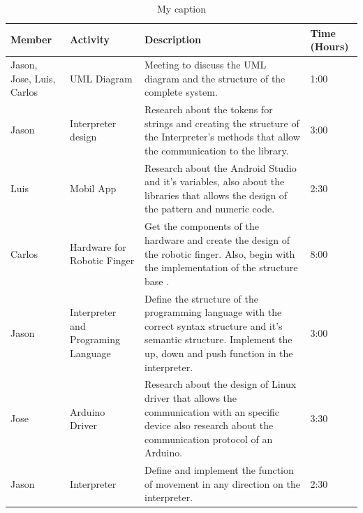 \documentclass[12pt,twoside]{article}
\begin{document}
\begin{table}[H]
\centering
\caption{My caption}
\label{my-label}
\begin{tabular}{ | m{7em} | m{7em} | m{16em} | m{4em} |}
\hline
\textbf{Member}                & \textbf{Activity}                            & \textbf{Description}                                                                                                                                                                                         & \textbf{Time (Hours)} \\
\hline
Jason, Jose, Luis, Carlos & UML Diagram                         & Meeting to discuss the UML diagram and the structure of the complete system.                                                                                                                        & 1:00         \\
\hline
Jason                    & Interpreter design                  & Research about the tokens for strings and creating the structure of the Interpreter's methods that allow the communication to the library.                                                          & 3:00         \\
\hline
Luis                     & Mobil App                           & Research about the Android Studio and it's variables, also about the libraries that allows the design of the pattern and numeric code.                                                              & 2:30         \\
\hline
Carlos                   & Hardware for Robotic Finger         & Get the components of the hardware and create the design of the robotic finger. Also, begin with the implementation of the structure base .                                                         & 8:00         \\
\hline
Jason                    & Interpreter and Programing Language & Define the structure of the programming language with the correct syntax structure and it's semantic structure. Implement the up, down and push function in the interpreter.                        & 3:00         \\
\hline
Jose                     & Arduino Driver                      & Research about the design of Linux driver that allows the communication with an specific device also research about the communication protocol of an Arduino.                                      & 3:30         \\
\hline
Jason                    & Interpreter                         & Define and implement the function of movement in any direction on the interpreter.                                                                                                                  & 2:30         \\
\hline


\end{tabular}
\end{table}
\end{document}
